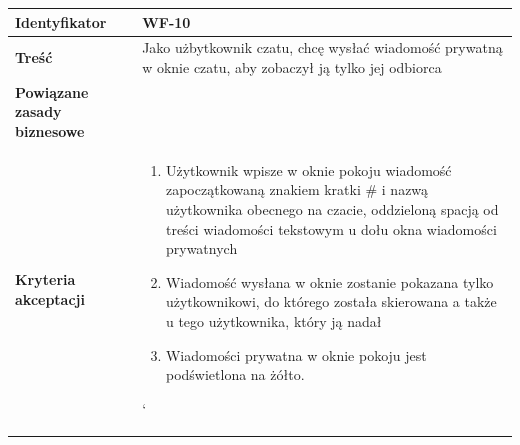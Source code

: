 \documentclass[11pt,oneside,a4paper,titlepage,onecolumn]{article}
\newenvironment{enumreq}
{ \begin{enumerate}[topsep=0pt,itemsep=-1ex,partopsep=1ex,parsep=1ex] }
{ \end{enumerate}                  }
\begin{document}
\begin{tabular}{ | l | l | }
	\hline
		\textbf{Identyfikator} & 
		WF-10
		\\
		
	\hline
		\textbf{Treść} & \parbox[t]{11cm}{
			Jako użbytkownik czatu, chcę wysłać wiadomość
			prywatną w oknie czatu, aby zobaczył ją tylko jej
			odbiorca
		}\\
		 
	\hline
		\parbox[t]{4cm}{\textbf{Powiązane zasady biznesowe}} & \parbox[t]{11cm}{
			
			
		}\\
		
	\hline
		\parbox[t]{4cm}{\textbf{Kryteria akceptacji}} & \parbox[t]{11cm}{
			\begin{enumreq}
				\item Użytkownik wpisze w oknie pokoju 
				wiadomość zapoczątkowaną znakiem kratki \# i nazwą 
				użytkownika obecnego na czacie, oddzieloną spacją 
				od treści wiadomości
				tekstowym u dołu okna wiadomości prywatnych
				\item Wiadomość wysłana w oknie zostanie pokazana
				tylko użytkownikowi, do którego została skierowana
				a także u tego użytkownika, który ją nadał
				\item Wiadomości prywatna w oknie pokoju jest
				podświetlona na żółto.
			\end{enumreq}`								
			}
		\\

	\hline
\end{tabular}


\vspace{2em} 
\end{document}
